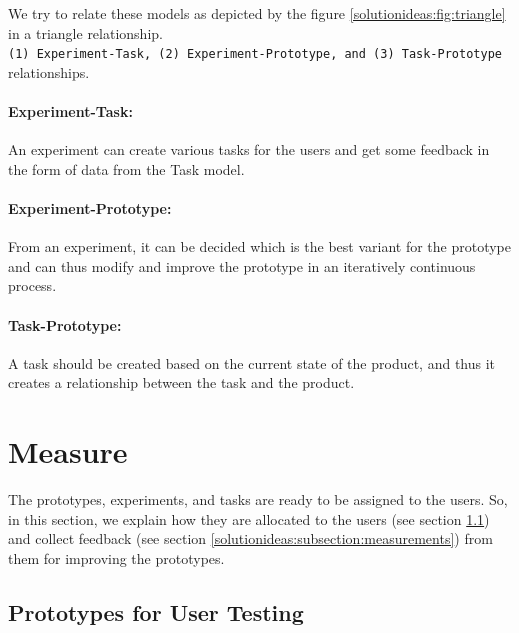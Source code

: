 We try to relate these models as depicted by the figure \ref{solutionideas:fig:triangle} in a triangle relationship.\\ 
\texttt{(1) Experiment-Task, (2) Experiment-Prototype, and (3) Task-Prototype} relationships.

\paragraph{Experiment-Task:} An experiment can create various tasks for the users and get some feedback in the form of data from the Task model. 

\paragraph{Experiment-Prototype:} From an experiment, it can be decided which is the best variant for the prototype and can thus modify and improve the prototype in an iteratively continuous process.

\paragraph{Task-Prototype:} A task should be created based on the current state of the product, and thus it creates a relationship between the task and the product.


\section{Measure}
The prototypes, experiments, and tasks are ready to be assigned to the users. 
So, in this section, we explain how they are allocated to the users (see section \ref{solutionideas:subsection:usertesting}) and collect feedback (see section \ref{solutionideas:subsection:measurements}) from them for improving the prototypes.

\subsection{Prototypes for User Testing}
\label{solutionideas:subsection:usertesting}

